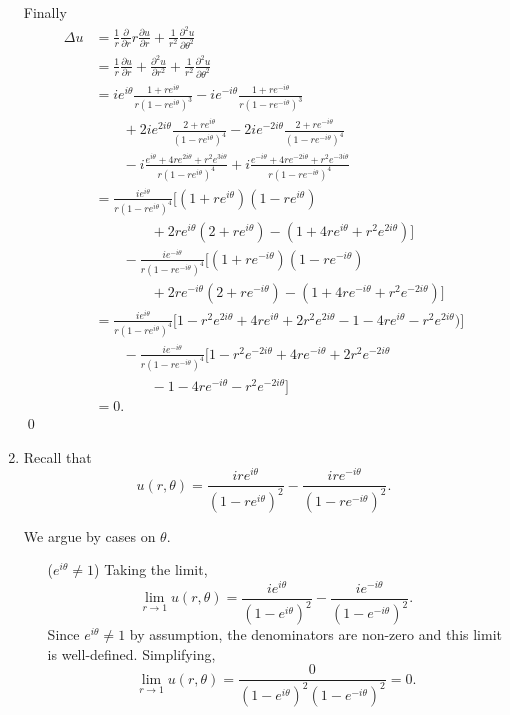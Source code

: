 \documentclass[paperoneside]{article}
\begin{document}
\begin{enumerate}[label=(\roman*)]
    Finally\begin{align*}
      \Delta u
      &= \frac1r \frac\partial{\partial r} r \frac{\partial u}{\partial r} + \frac1{r^2} \frac{\partial^2 u}{\partial \theta^2} \\
      &= \frac1r \frac{\partial u}{\partial r}
      + \frac{\partial^2 u}{\partial r^2}
      + \frac1{r^2} \frac{\partial^2 u}{\partial \theta^2} \\
      &= ie^{i\theta}\frac{1+re^{i\theta}}{r(1-re^{i\theta})^3} 
      - ie^{-i\theta}\frac{1+re^{-i\theta}}{r(1-re^{-i\theta})^3} \\
      &\qquad + 2ie^{2i\theta}\frac{2+re^{i\theta}}{(1-re^{i\theta})^4}
      - 2ie^{-2i\theta}\frac{2+re^{-i\theta}}{(1-re^{-i\theta})^4} \\
      &\qquad -i\frac{e^{i\theta} + 4re^{2i\theta} + r^2e^{3i\theta}}{r(1-re^{i\theta})^4} + i\frac{e^{-i\theta} + 4re^{-2i\theta} + r^2e^{-3i\theta}}{r(1-re^{-i\theta})^4} \\
      &= \frac{ie^{i\theta}}{r(1-re^{i\theta})^4}\Big[
      (1+re^{i\theta})(1 - re^{i\theta}) \\
      &\qquad\qquad+ 2re^{i\theta}(2+re^{i\theta})
      - (1 + 4re^{i\theta} + r^2e^{2i\theta}) \Big] \\
      &\qquad- \frac{ie^{-i\theta}}{r(1-re^{-i\theta})^4}\Big[
      (1+re^{-i\theta})(1 - re^{-i\theta}) \\
      &\qquad\qquad+ 2re^{-i\theta}(2+re^{-i\theta})
      - (1 + 4re^{-i\theta} + r^2e^{-2i\theta}) \Big] \\
      &= \frac{ie^{i\theta}}{r(1-re^{i\theta})^4}\Big[
      1-r^2e^{2i\theta} + 4re^{i\theta}+2r^2e^{2i\theta}
      - 1 - 4re^{i\theta} - r^2e^{2i\theta}) \Big] \\
      &\qquad- \frac{ie^{-i\theta}}{r(1-re^{-i\theta})^4}\Big[
      1-r^2e^{-2i\theta} + 4re^{-i\theta}+2r^2e^{-2i\theta} \\
      &\qquad\qquad- 1 - 4re^{-i\theta} - r^2e^{-2i\theta} \Big] \\
      &= 0 \text{.}
    \end{align*}\qed

    \item Recall that \[
      u(r, \theta)
      = \frac{ire^{i\theta}}{(1 - re^{i\theta})^2}
      - \frac{ire^{-i\theta}}{(1 - re^{-i\theta})^2} \text{.}
    \] 

    We argue by cases on $\theta$. \begin{itemize}[leftmargin=43pt]
      \item[($e^{i\theta} \neq 1$)] Taking the limit,\[
          \lim_{r\to1} u(r, \theta)
          = \frac{ie^{i\theta}}{(1-e^{i\theta})^2}
          - \frac{ie^{-i\theta}}{(1-e^{-i\theta})^2} \text{.}
        \] Since $e^{i\theta} \neq 1$ by assumption, the denominators are non-zero and this limit is well-defined. Simplifying,\[
          \lim_{r\to1} u(r, \theta)
          = \frac{0}{(1-e^{i\theta})^2(1-e^{-i\theta})^2} = 0
           \text{.}
        \]


\end{itemize}
\end{enumerate}
\end{document}
